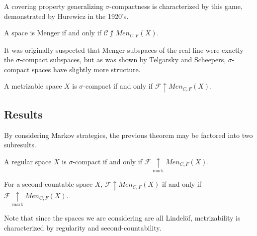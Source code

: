 \documentclass{beamer}
\theoremstyle{definition}
\newcommand{\win}{\uparrow}
\newcommand{\markwin}{\underset{\text{mark}}{\uparrow}}
\newcommand{\menGame}[1]{Men_{C,F}\left({#1}\right)}
\newcommand{\<}{\langle}
\renewcommand{\>}{\rangle}
\newcommand{\pl}[1]{\mathscr{#1}}
\begin{document}
\begin{frame}
  A covering property generalizing $\sigma$-compactness is characterized
  by this game, demonstrated by Hurewicz in the 1920's. \cite{MR1544773}

  \begin{theorem}
    A space is Menger if and only if $\pl C\not\win\menGame{X}$.
  \end{theorem}

  \pause

  It was originally suspected that Menger subspaces of the real line were
  exactly the $\sigma$-compact subspaces, but as was shown by Telgarsky
  and Scheepers, $\sigma$-compact spaces
  have slightly more structure. \cite{MR753073} \cite{MR1273523}

  \begin{theorem}
    A metrizable space $X$ is $\sigma$-compact if and only if
    $\pl F\win\menGame{X}$.
  \end{theorem}
\end{frame}

\subsection{Results}

\begin{frame}
  By considering Markov strategies, the previous theorem may be factored
  into two subresults.

  \begin{theorem}
    A regular space $X$ is $\sigma$-compact if and only if
    $\pl F\markwin\menGame{X}$.
  \end{theorem}
  \begin{theorem}
    For a second-countable space $X$, $\pl F\win\menGame{X}$ if and only if
    $\pl F\markwin\menGame{X}$.
  \end{theorem}

  Note that since the spaces we are considering are all Lindel\"of,
  metrizability is characterized by regularity and second-countability.
\end{frame}
\end{document}
